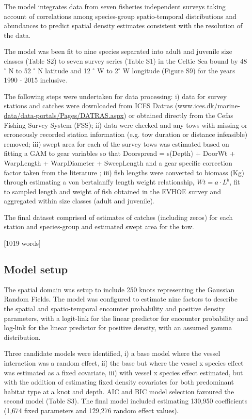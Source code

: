 \documentclass{nature}
\begin{document}
\begin{linenumbers}
The model integrates data from seven fisheries independent surveys taking
account of correlations among species-group spatio-temporal distributions and
abundances to predict spatial density estimates consistent with the resolution
of the data. 

The model was been fit to nine species separated into adult and juvenile size
classes (Table S2) to seven survey series (Table S1) in the Celtic Sea bound by
48$^{\circ}$ N to 52 $^{\circ}$ N latitude and 12 $^{\circ}$ W to 2$^{\circ}$ W
longitude (Figure S9) for the years 1990 - 2015 inclusive. 

The following steps were undertaken for data processing: i) data for survey
stations and catches were downloaded from ICES Datras
(\url{www.ices.dk/marine-data/data-portals/Pages/DATRAS.aspx}) or obtained
directly from the Cefas Fishing Survey System (FSS); ii) data were checked and
any tows with missing or erroneously recorded station information (e.g. tow
duration or distance infeasible) removed; iii) swept area for each of the
survey tows was estimated based on fitting a GAM to gear variables so that
Doorspread = s(Depth) + DoorWt + WarpLength + WarpDiameter + SweepLength and a
gear specific correction factor taken from the literature \cite{Piet2009}; iii)
fish lengths were converted to biomass (Kg) through estimating a von
bertalanffy length weight relationship, $Wt = a \cdot L^{b}$, fit to sampled
length and weight of fish obtained in the EVHOE survey and aggregated within
size classes (adult and juvenile). 

The final dataset comprised of estimates of catches (including zeros) for each
station and species-group and estimated swept area for the tow.

[1019 words]

\subsection{Model setup}

The spatial domain was setup to include 250 knots representing the Gaussian
Random Fields. The model was configured to estimate nine factors to describe
the spatial and spatio-temporal encounter probability and positive density
parameters, with a logit-link for the linear predictor for encounter
probability and log-link for the linear predictor for positive density, with an
assumed gamma distribution.

Three candidate models were identified, i) a base model where the vessel
interaction was a random effect, ii) the base but where the vessel x species
effect was estimated as a fixed covariate, iii) with vessel x species effect
estimated, but with the addition of estimating fixed density covariates for
both predominant habitat type at a knot and depth. AIC and BIC model selection
favoured the second model (Table S3). The final model included estimating
130,950 coefficients (1,674 fixed parameters and 129,276 random effect values).


\end{linenumbers}
\end{document}
